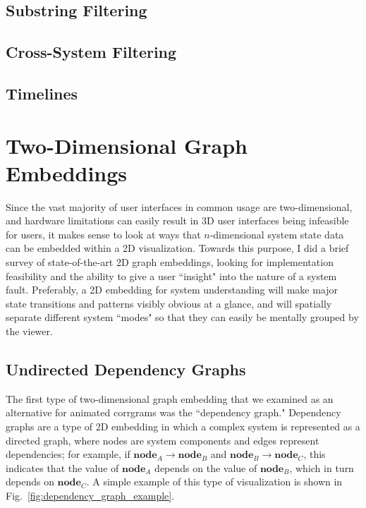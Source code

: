 \subsection{Substring Filtering}

\subsection{Cross-System Filtering}

\subsection{Timelines}


\section{Two-Dimensional Graph Embeddings}

Since the vast majority of user interfaces in common usage are two-dimensional, and hardware limitations can easily result in 3D user interfaces being infeasible for users, it makes sense to look at ways that $n$-dimensional system state data can be embedded within a 2D visualization. Towards this purpose, I did a brief survey of state-of-the-art 2D graph embeddings, looking for implementation feasibility and the ability to give a user ``insight" into the nature of a system fault. Preferably, a 2D embedding for system understanding will make major state transitions and patterns visibly obvious at a glance, and will spatially separate different system ``modes" so that they can easily be mentally grouped by the viewer.

\subsection{Undirected Dependency Graphs}

The first type of two-dimensional graph embedding that we examined as an alternative for animated corrgrams was the ``dependency graph." Dependency graphs are a type of 2D embedding in which a complex system is represented as a directed graph, where nodes are system components and edges represent dependencies; for example, if $\textbf{node}_{A} \rightarrow \textbf{node}_{B}$ and $\textbf{node}_{B} \rightarrow \textbf{node}_{C}$, this indicates that the value of $\textbf{node}_{A}$ depends on the value of $\textbf{node}_{B}$, which in turn depends on $\textbf{node}_{C}$. A simple example of this type of visualization is shown in Fig.~\ref{fig:dependency_graph_example}.

